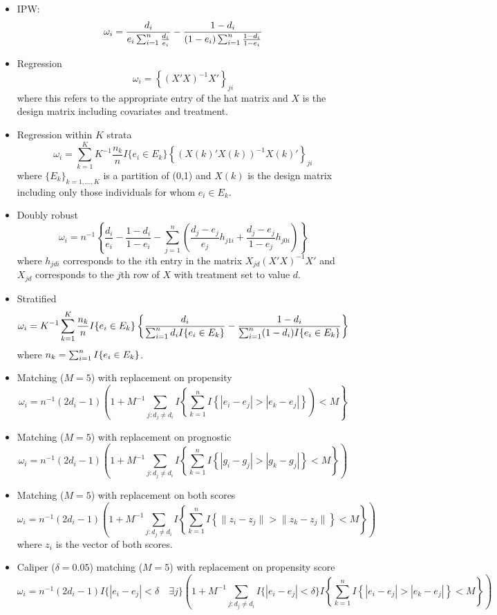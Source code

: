 \documentclass[]{article}
\providecommand{\tightlist}{%
  \setlength{\itemsep}{0pt}\setlength{\parskip}{0pt}}
\begin{document}
\begin{itemize}
\tightlist
\item
  IPW:
  \[\omega_i = \frac{d_i}{e_i \sum_{i=1}^n \frac{d_i}{e_i}} -  \frac{1-d_i}{(1-e_i)\sum_{i=1}^n \frac{1-d_i}{1-e_i}}\]
\item
  Regression \[ \omega_i = \left\{(X'X)^{-1}X'\right\}_{ji} \] where
  this refers to the appropriate entry of the hat matrix and \(X\) is
  the design matrix including covariates and treatment.
\item
  Regression within \(K\) strata
  \[ \omega_i = \sum_{k=1}^KK^{-1}\frac{n_k}{n}I\{e_i \in E_k\}\left\{(X(k)'X(k))^{-1}X(k)'\right\}_{ji} \]
  where \(\{E_k\}_{k = 1, ..., K}\) is a partition of (0,1) and \(X(k)\)
  is the design matrix including only those individuals for whom
  \(e_i \in E_k\).
\item
  Doubly robust
  \[ \omega_i = n^{-1}\left\{ \frac{d_i}{e_i} - \frac{1-d_i}{1-e_i} - \sum_{j=1}^n\left( \frac{d_j - e_j}{e_j}h_{j1i} + \frac{d_j - e_j}{1-e_j}h_{j0i}\right)  \right\} \]
  where \(h_{jdi}\) corresponds to the \(i\)th entry in the matrix
  \(X_{jd}(X'X)^{-1}X'\) and \(X_{jd}\) corresponds to the \(j\)th row
  of \(X\) with treatment set to value \(d\).
\item
  Stratified
  \[ \omega_i = K^{-1}\sum_{k=1}^K\frac{n_k}{n}I\{e_i \in E_k\}\left\{\frac{d_i}{\sum_{i=1}^n d_iI\{e_i \in E_k\}} -  \frac{1-d_i}{\sum_{i=1}^n (1-d_i)I\{e_i \in E_k\}}\right\} \]
  where \(n_k = \sum_{i=1}^n I\{e_i \in E_k\}\).
\item
  Matching (\(M = 5\)) with replacement on propensity
  \[ \omega_i = n^{-1}(2d_i - 1)\left(1 + M^{-1}\sum_{j: d_j \neq d_i}I\left\{\sum_{k=1}^n I\left\{|e_i - e_j| > |e_k - e_j|\right\}\right) < M\right\} \]
\item
  Matching (\(M = 5\)) with replacement on prognostic
  \[ \omega_i = n^{-1}(2d_i - 1)\left(1 + M^{-1}\sum_{j: d_j \neq d_i} I\left\{\sum_{k=1}^n I\left\{|g_i - g_j| > |g_k - g_j|\right\} < M\right\}\right) \]
\item
  Matching (\(M = 5\)) with replacement on both scores
  \[ \omega_i = n^{-1}(2d_i - 1)\left(1 + M^{-1}\sum_{j: d_j \neq d_i} I\left\{\sum_{k=1}^n I\left\{\|z_i - z_j\| > \|z_k - z_j\|\right\} < M\right\}\right) \]
  where \(z_i\) is the vector of both scores.
\item
  Caliper (\(\delta = 0.05\)) matching (\(M = 5\)) with replacement on
  propensity score
  \[ \omega_i = n^{-1}(2d_i - 1)I\{|e_i - e_j| < \delta \quad \exists j\}\left(1 + M^{-1}\sum_{j: d_j \neq d_i} I\{|e_i - e_j| < \delta\}I\left\{\sum_{k=1}^n I\left\{|e_i - e_j| > |e_k - e_j|\right\} < M\right\}\right) \]

\end{itemize}
\end{document}
